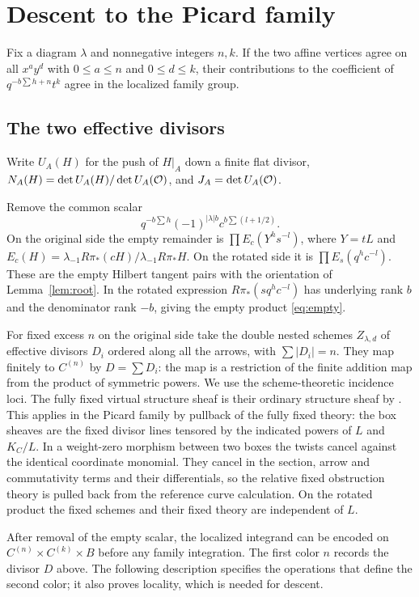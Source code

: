 \section{Descent to the Picard family}\label{sec:descent}
\begin{proposition}\label{prop:descent}
Fix a diagram $\lambda$ and nonnegative integers $n,k$. If the two
affine vertices agree on all $x^a y^d$ with $0\le a\le n$ and
$0\le d\le k$, their contributions to the coefficient of
$q^{-b\sum h+n}t^k$ agree in the localized family group.
\end{proposition}
\subsection{The two effective divisors}
Write $U_A(H)$ for the push of $H|_A$ down a finite flat divisor,
$N_A(H)=\det U_A(H)/\det U_A(\mathcal O)$, and $J_A=\det U_A(\mathcal O)$.


Remove the common scalar
\[
 q^{-b\sum h}(-1)^{|\lambda|b}c^{b\sum(l+1/2)}.
\]
On the original side the empty remainder is $\prod E_c(Y^h s^{-l})$, where $Y=tL$ and $E_c(H)=\lambda_{-1}R\pi_*(cH)/\lambda_{-1}R\pi_*H$. On the rotated side it is $\prod E_s(q^h c^{-l})$. These are the empty Hilbert tangent pairs with the orientation of Lemma~\ref{lem:root}. In the rotated expression $R\pi_*(s q^h c^{-l})$ has underlying rank $b$ and the denominator rank $-b$, giving the empty product \eqref{eq:empty}.

For fixed excess $n$ on the original side take the double nested schemes $Z_{\lambda,d}$ of effective divisors $D_i$ ordered along all the arrows, with $\sum |D_i|=n$. They map finitely to $C^{(n)}$ by $D=\sum D_i$: the map is a restriction of the finite addition map from the product of symmetric powers. We use the scheme-theoretic incidence loci. The fully fixed virtual structure sheaf is their ordinary structure sheaf by \cite[Theorem~6.1]{MR}. This applies in the Picard family by pullback of the fully fixed theory: the box sheaves are the fixed divisor lines tensored by the indicated powers of $L$ and $K_C/L$. In a weight-zero morphism between two boxes the twists cancel against the identical coordinate monomial. They cancel in the section, arrow and commutativity terms and their differentials, so the relative fixed obstruction theory is pulled back from the reference curve calculation. On the rotated product the fixed schemes and their fixed theory are independent of $L$.

After removal of the empty scalar, the localized integrand can be encoded on $C^{(n)}\times C^{(k)}\times B$ before any family integration. The first color $n$ records the divisor $D$ above. The following description specifies the operations that define the second color; it also proves locality, which is needed for descent.

